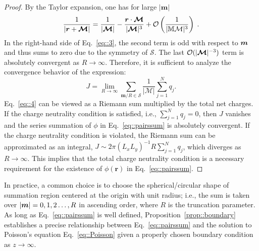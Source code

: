 \begin{proof}
	By the Taylor expansion, one has for large $|\bm{m}|$
	\begin{equation}\label{eq::3}
		\frac{1}{|\bm{r} + \bm{\mathcal{M}}|} = \frac{1}{|\bm{\mathcal{M}}|} - \frac{\bm{r} \cdot \bm{\mathcal{M}}}{|\bm{\mathcal{M}}|^3} + \mathcal{O} \left(\frac{1}{|\mathcal{\mathbb{M} M}|^3}\right)\;.
	\end{equation}
	In the right-hand side of Eq.~\eqref{eq::3}, the second term is odd with respect to $\boldsymbol{m}$ and thus sums to zero due to the symmetry of $\mathcal{S}$. The last $\mathcal{O}(|\boldsymbol{\mathcal{M}}|^{-3})$ term is absolutely convergent as $R\rightarrow \infty$. Therefore, it is sufficient to analyze the convergence behavior of the expression:
	\begin{equation}\label{eq::4}
        J=\lim_{R\rightarrow\infty}\sum_{\bm{m}/ R \in \mathcal{S}}\frac{1}{|\bm{\mathcal{M}}|}\sum_{j=1}^{N}q_{j}.
	\end{equation}
	Eq.~\eqref{eq::4} can be viewed as a Riemann sum multiplied by the total net charges. If the charge neutrality condition is satisfied, i.e., $\sum_{j=1}^{N}q_{j}=0$, then $J$ vanishes and the series summation of $\phi$ in Eq.~\eqref{eq::pairssum} is absolutely convergent. 
	If the charge neutrality condition is violated, the Riemann sum can be approximated as an integral, $J\sim 2\pi (L_xL_y)^{-1} R\sum_{j=1}^{N}q_{j}$, which diverges as $R\rightarrow \infty$. This implies that the total charge neutrality condition is a necessary requirement for the existence of $\phi(\bm{r})$ in Eq.~\eqref{eq::pairssum}.
\end{proof}

In practice, a common choice is to choose the spherical/circular shape of summation region centered at the origin with unit radius; i.e., the sum is taken over $\lvert\boldsymbol{m}\rvert=0, 1, 2\ldots, R$ in ascending order, where $R$ is the truncation parameter.
As long as Eq.~\eqref{eq::pairssum} is well defined, Proposition~\ref{prop::boundary} establishes a precise relationship between Eq.~\eqref{eq::pairssum} and the solution to Poisson's equation Eq.~\eqref{eq::Poisson} given a properly chosen boundary condition as $z\to\infty$.

